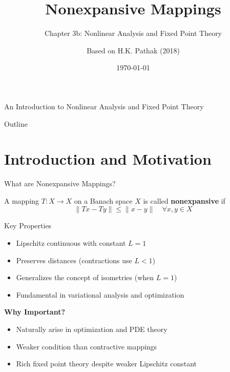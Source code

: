 \documentclass[aspectratio=169,10pt]{beamer}
\title{Nonexpansive Mappings}
\subtitle{Chapter 3b: Nonlinear Analysis and Fixed Point Theory}
\author{Based on H.K. Pathak (2018)}
\date{\today}
\begin{document}
\begin{frame}
    \titlepage
    \vspace{-0.5cm}
    {\small\color{gray} An Introduction to Nonlinear Analysis and Fixed Point Theory}
\end{frame}

\begin{frame}{Outline}
    \tableofcontents
\end{frame}

\section{Introduction and Motivation}

\begin{frame}{What are Nonexpansive Mappings?}
    \begin{definition}
        A mapping $T: X \to X$ on a Banach space $X$ is called \textbf{nonexpansive} if
        \[
        \|Tx - Ty\| \leq \|x - y\| \quad \forall x, y \in X
        \]
    \end{definition}

    \vspace{0.5cm}

    \begin{block}{Key Properties}
        \begin{itemize}
            \item Lipschitz continuous with constant $L = 1$
            \item Preserves distances (contractions use $L < 1$)
            \item Generalizes the concept of isometries (when $L = 1$)
            \item Fundamental in variational analysis and optimization
        \end{itemize}
    \end{block}

    \vspace{0.5cm}

    \textbf{Why Important?}
    \begin{itemize}
        \item Naturally arise in optimization and PDE theory
        \item Weaker condition than contractive mappings
        \item Rich fixed point theory despite weaker Lipschitz constant
    \end{itemize}
\end{frame}
\end{document}
